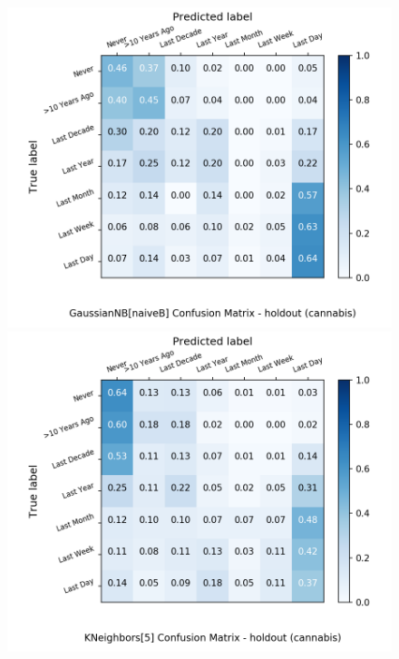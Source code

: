 \begin{figure}[H]
	\begin{minipage}[b]{0.32\textwidth}
		\includegraphics[width=1.1\textwidth]{Plots/drugs/cannabis_GaussianNB_naiveB_balance_False_holdout.png}
	\end{minipage}
	\begin{minipage}[b]{0.32\textwidth}
		\includegraphics[width=1.1\textwidth]{Plots/drugs/cannabis_KNeighbors_5_balance_False_holdout.png}
  \end{minipage}
	\begin{minipage}[b]{0.32\textwidth}

\end{minipage}
\end{figure}

